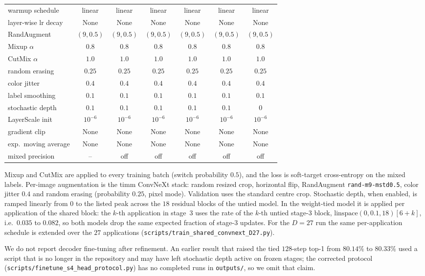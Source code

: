\begin{table}[t]
\begin{tabular}{lcccccc}
        warmup schedule            & linear & linear & linear & linear & linear & linear \\
        layer-wise lr decay        & None & None & None & None & None & None \\
        RandAugment                & $(9,0.5)$ & $(9,0.5)$ & $(9,0.5)$ & $(9,0.5)$ & $(9,0.5)$ & $(9,0.5)$ \\
        Mixup $\alpha$             & $0.8$ & $0.8$ & $0.8$ & $0.8$ & $0.8$ & $0.8$ \\
        CutMix $\alpha$            & $1.0$ & $1.0$ & $1.0$ & $1.0$ & $1.0$ & $1.0$ \\
        random erasing             & $0.25$ & $0.25$ & $0.25$ & $0.25$ & $0.25$ & $0.25$ \\
        color jitter               & $0.4$ & $0.4$ & $0.4$ & $0.4$ & $0.4$ & $0.4$ \\
        label smoothing            & $0.1$ & $0.1$ & $0.1$ & $0.1$ & $0.1$ & $0.1$ \\
        stochastic depth           & $0.1$ & $0.1$ & $0.1$ & $0.1$ & $0.1$ & $0$ \\
        LayerScale init            & $10^{-6}$ & $10^{-6}$ & $10^{-6}$ & $10^{-6}$ & $10^{-6}$ & $10^{-6}$ \\
        gradient clip              & None & None & None & None & None & None \\
        exp.\ moving average       & None & None & None & None & None & None \\
        mixed precision            & -- & off & off & off & off & off \\
        \bottomrule
    \end{tabular}
\end{table}

Mixup and CutMix are applied to every training batch (switch probability $0.5$), and the
loss is soft-target cross-entropy on the mixed labels.
Per-image augmentation is the timm ConvNeXt stack: random resized crop, horizontal flip,
RandAugment \texttt{rand-m9-mstd0.5}, color jitter $0.4$ and random erasing
(probability $0.25$, pixel mode).
Validation uses the standard centre crop.
Stochastic depth, when enabled, is ramped linearly from $0$ to the listed peak across the
$18$ residual blocks of the untied model.
In the weight-tied model it is applied per application of the shared block: the $k$-th
application in stage~3 uses the rate of the $k$-th untied stage-3 block,
$\mathrm{linspace}(0,0.1,18)[6{+}k]$, i.e.\ $0.035$ to $0.082$, so both models drop the
same expected fraction of stage-3 updates.
For the $D{=}27$ run the same per-application schedule is extended over the $27$
applications (\texttt{scripts/train\_shared\_convnext\_D27.py}).

We do not report decoder fine-tuning after refinement.
An earlier result that raised the tied $128$-step top-1 from $80.14\%$ to $80.33\%$
used a script that is no longer in the repository and may have left stochastic depth
active on frozen stages; the corrected protocol
(\texttt{scripts/finetune\_s4\_head\_protocol.py}) has no completed runs in
\texttt{outputs/}, so we omit that claim.
